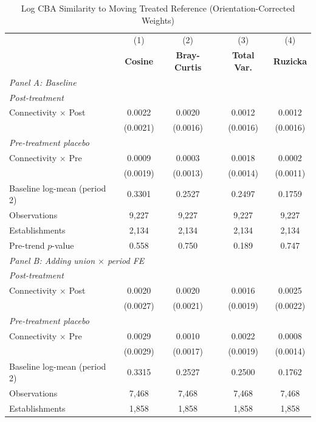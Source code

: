 \begin{table}[H]
\centering
\caption{Log CBA Similarity to Moving Treated Reference (Orientation-Corrected Weights)}
\label{tab:corr_w_ln_cba_similarity}
\scriptsize
\setlength{\tabcolsep}{8pt}
\begin{tabular}{lcccc}
\hline\hline
 & (1) & (2) & (3) & (4) \\
 & \textbf{Cosine} & \textbf{Bray-Curtis} & \textbf{Total Var.} & \textbf{Ruzicka} \\
\hline
\multicolumn{5}{l}{\textit{Panel A: Baseline}} \\
\multicolumn{5}{l}{\textit{Post-treatment}} \\
Connectivity $\times$ Post & 0.0022 & 0.0020 & 0.0012 & 0.0012 \\
 & (0.0021) & (0.0016) & (0.0016) & (0.0016) \\
\multicolumn{5}{l}{\textit{Pre-treatment placebo}} \\
Connectivity $\times$ Pre & 0.0009 & 0.0003 & 0.0018 & 0.0002 \\
 & (0.0019) & (0.0013) & (0.0014) & (0.0011) \\
\hline
Baseline log-mean (period 2) & 0.3301 & 0.2527 & 0.2497 & 0.1759 \\
Observations &        9,227 &        9,227 &        9,227 &        9,227 \\
Establishments &        2,134 &        2,134 &        2,134 &        2,134 \\
Pre-trend $p$-value & 0.558 & 0.750 & 0.189 & 0.747 \\
\hline
\multicolumn{5}{l}{\textit{Panel B: Adding union $\times$ period FE}} \\
\multicolumn{5}{l}{\textit{Post-treatment}} \\
Connectivity $\times$ Post & 0.0020 & 0.0020 & 0.0016 & 0.0025 \\
 & (0.0027) & (0.0021) & (0.0019) & (0.0022) \\
\multicolumn{5}{l}{\textit{Pre-treatment placebo}} \\
Connectivity $\times$ Pre & 0.0029 & 0.0010 & 0.0022 & 0.0008 \\
 & (0.0029) & (0.0017) & (0.0019) & (0.0014) \\
\hline
Baseline log-mean (period 2) & 0.3315 & 0.2527 & 0.2500 & 0.1762 \\
Observations &        7,468 &        7,468 &        7,468 &        7,468 \\
Establishments &        1,858 &        1,858 &        1,858 &        1,858 \\

\end{tabular}
\end{table}

